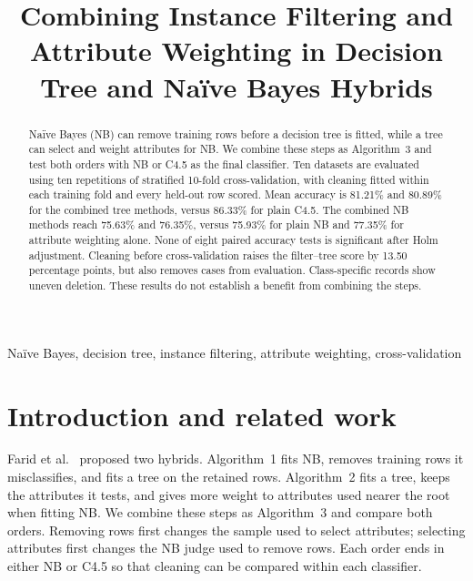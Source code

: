 \documentclass[conference]{IEEEtran}
\begin{document}
\title{Combining Instance Filtering and Attribute Weighting in Decision Tree and Na\"ive Bayes Hybrids}
\author{
\and
{}
}


\maketitle
\begin{abstract}
Na\"ive Bayes (NB) can remove training rows before a decision tree is
fitted, while a tree can select and weight attributes for NB. We combine
these steps as Algorithm~3 and test both orders with NB or C4.5 as the
final classifier. Ten datasets are evaluated using ten repetitions of
stratified 10-fold cross-validation, with cleaning fitted within each
training fold and every held-out row scored. Mean accuracy is 81.21\%
and 80.89\% for the combined tree methods, versus 86.33\% for plain C4.5.
The combined NB methods reach 75.63\% and 76.35\%, versus 75.93\% for plain
NB and 77.35\% for attribute weighting alone. None of eight paired
accuracy tests is significant after Holm adjustment. Cleaning before
cross-validation raises the filter--tree score by 13.50 percentage points,
but also removes cases from evaluation. Class-specific records show uneven
deletion. These results do not establish a benefit from combining the steps.
\end{abstract}
\begin{IEEEkeywords}
Na\"ive Bayes, decision tree, instance filtering, attribute weighting,
cross-validation
\end{IEEEkeywords}

\section{Introduction and related work}
Farid et al.~\cite{farid2014hybrid} proposed two hybrids. Algorithm~1 fits
NB, removes training rows it misclassifies, and fits a tree on the retained
rows. Algorithm~2 fits a tree, keeps the attributes it tests, and gives
more weight to attributes used nearer the root when fitting NB. We combine
these steps as Algorithm~3 and compare both orders. Removing rows first
changes the sample used to select attributes; selecting attributes first
changes the NB judge used to remove rows. Each order ends in either NB or
C4.5 so that cleaning can be compared within each classifier.
\end{document}
